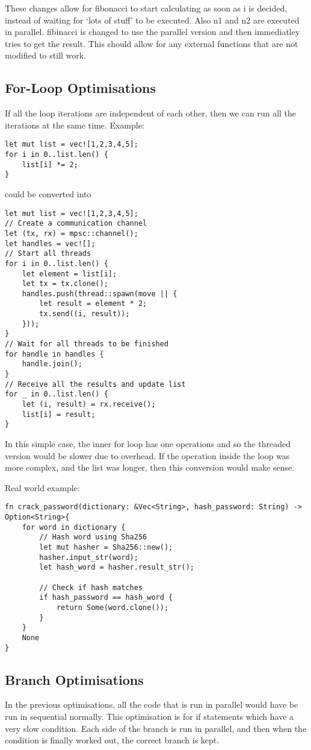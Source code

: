 \documentclass[conference]{IEEEtran}
\begin{document}
These changes allow for fibonacci to start calculating as soon as i is decided, instead of waiting for `lots of stuff' to be executed. Also n1 and n2 are executed in parallel. fibinacci is changed to use the parallel version and then immediatley tries to get the result. This should allow for any external functions that are not modified to still work.

\subsection{For-Loop Optimisations}
If all the loop iterations are independent of each other, then we can run all the iterations at the same time. Example:

\begin{verbatim}
let mut list = vec![1,2,3,4,5];
for i in 0..list.len() {
    list[i] *= 2;
}
\end{verbatim}
could be converted into
\begin{verbatim}
let mut list = vec![1,2,3,4,5];
// Create a communication channel
let (tx, rx) = mpsc::channel();
let handles = vec![];
// Start all threads
for i in 0..list.len() {
    let element = list[i];
    let tx = tx.clone();
    handles.push(thread::spawn(move || {
        let result = element * 2;
        tx.send((i, result));
    }));
}
// Wait for all threads to be finished
for handle in handles {
    handle.join();
}
// Receive all the results and update list
for _ in 0..list.len() {
    let (i, result) = rx.receive();
    list[i] = result;
}
\end{verbatim}
In this simple case, the inner for loop has one operations and so the threaded version would be slower due to overhead. If the operation inside the loop was more complex, and the list was longer, then this conversion would make sense.

Real world example:
\begin{verbatim}
fn crack_password(dictionary: &Vec<String>, hash_password: String) -> Option<String>{
    for word in dictionary {
        // Hash word using Sha256
        let mut hasher = Sha256::new();
        hasher.input_str(word);
        let hash_word = hasher.result_str();

        // Check if hash matches
        if hash_password == hash_word {
            return Some(word.clone());
        }
    }
    None
}
\end{verbatim}

\subsection{Branch Optimisations}
In the previous optimisations, all the code that is run in parallel would have be run in sequential normally. This optimisation is for if statements which have a very slow condition. Each side of the branch is run in parallel, and then when the condition is finally worked out, the correct branch is kept.
\end{document}
